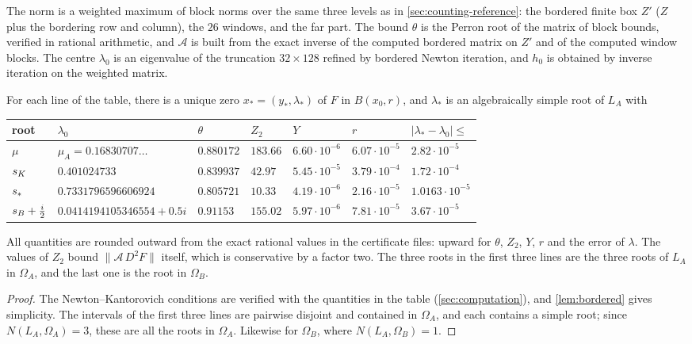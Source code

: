 The norm is a weighted maximum of block norms over the same three levels as in \cref{sec:counting-reference}:
the bordered finite box $Z'$ ($Z$ plus the bordering row and column), the $26$ windows, and the far part. The
bound $\theta$ is the Perron root of the matrix of block bounds, verified in rational arithmetic, and $\mathcal A$
is built from the exact inverse of the computed bordered matrix on $Z'$ and of the computed window blocks. The
centre $\lambda_0$ is an eigenvalue of the truncation $32\times128$ refined by bordered Newton iteration, and
$h_0$ is obtained by inverse iteration on the weighted matrix.

\begin{proposition}\label{prop:nk}
For each line of the table, there is a unique zero $x_*=(y_*,\lambda_*)$ of $F$ in $B(x_0,r)$, and $\lambda_*$ is an
algebraically simple root of $L_A$ with
\begin{center}
\begin{tabular}{@{}lllllll@{}}
\toprule
root & $\lambda_0$ & $\theta$ & $Z_2$ & $Y$ & $r$ & $|\lambda_*-\lambda_0|\le$ \\
\midrule
$\mu$ & $\mu_A=0.16830707\ldots$ & $0.880172$ & $183.66$ & $6.60\cdot10^{-6}$ & $6.07\cdot10^{-5}$ & $2.82\cdot10^{-5}$ \\
$s_{K}$ & $0.401024733$ & $0.839937$ & $42.97$ & $5.45\cdot10^{-5}$ & $3.79\cdot10^{-4}$ & $1.72\cdot10^{-4}$ \\
$s_{\ast}$ & $0.7331796596606924$ & $0.805721$ & $10.33$ & $4.19\cdot10^{-6}$ & $2.16\cdot10^{-5}$ & $1.0163\cdot10^{-5}$ \\
$s_{B}+\frac i2$ & $0.0414194105346554+0.5i$ & $0.91153$ & $155.02$ & $5.97\cdot10^{-6}$ & $7.81\cdot10^{-5}$ & $3.67\cdot10^{-5}$ \\
\bottomrule
\end{tabular}
\end{center}
All quantities are rounded outward from the exact rational values in the certificate files: upward for $\theta$,
$Z_2$, $Y$, $r$ and the error of $\lambda$. The values of $Z_2$ bound $\|\mathcal A\,D^2F\|$ itself, which is
conservative by a factor two. The three roots in the first three lines are the three roots of $L_A$ in $\Omega_A$, and the last one is the root in
$\Omega_B$.
\end{proposition}

\begin{proof}
The Newton--Kantorovich conditions are verified with the quantities in the table (\cref{sec:computation}), and
\cref{lem:bordered} gives simplicity. The intervals of the first three lines are pairwise disjoint and contained
in $\Omega_A$, and each contains a simple root; since $N(L_A,\Omega_A)=3$, these are all the roots in $\Omega_A$.
Likewise for $\Omega_B$, where $N(L_A,\Omega_B)=1$.
\end{proof}

